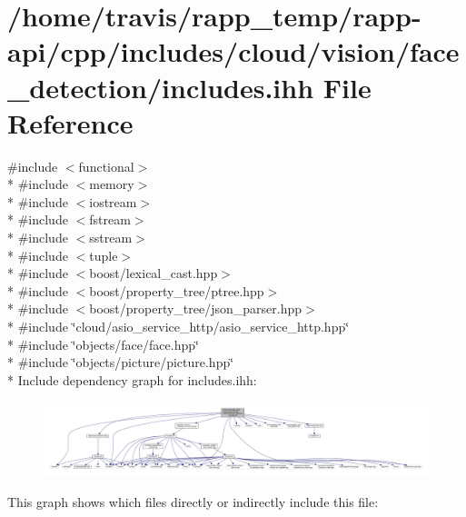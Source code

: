 \hypertarget{cloud_2vision_2face__detection_2includes_8ihh}{\section{/home/travis/rapp\-\_\-temp/rapp-\/api/cpp/includes/cloud/vision/face\-\_\-detection/includes.ihh File Reference}
\label{cloud_2vision_2face__detection_2includes_8ihh}
}
{\ttfamily \#include $<$functional$>$}\\*
{\ttfamily \#include $<$memory$>$}\\*
{\ttfamily \#include $<$iostream$>$}\\*
{\ttfamily \#include $<$fstream$>$}\\*
{\ttfamily \#include $<$sstream$>$}\\*
{\ttfamily \#include $<$tuple$>$}\\*
{\ttfamily \#include $<$boost/lexical\-\_\-cast.\-hpp$>$}\\*
{\ttfamily \#include $<$boost/property\-\_\-tree/ptree.\-hpp$>$}\\*
{\ttfamily \#include $<$boost/property\-\_\-tree/json\-\_\-parser.\-hpp$>$}\\*
{\ttfamily \#include \char`\"{}cloud/asio\-\_\-service\-\_\-http/asio\-\_\-service\-\_\-http.\-hpp\char`\"{}}\\*
{\ttfamily \#include \char`\"{}objects/face/face.\-hpp\char`\"{}}\\*
{\ttfamily \#include \char`\"{}objects/picture/picture.\-hpp\char`\"{}}\\*
Include dependency graph for includes.\-ihh\-:
\nopagebreak
\begin{figure}[H]
\begin{center}
\leavevmode
\includegraphics[width=350pt]{cloud_2vision_2face__detection_2includes_8ihh__incl}
\end{center}
\end{figure}
This graph shows which files directly or indirectly include this file\-:
\nopagebreak
